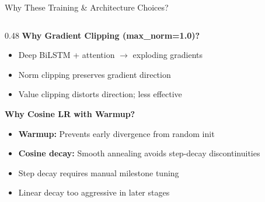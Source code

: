 \documentclass[10pt, aspectratio=169]{beamer}
\begin{document}
\begin{frame}{Why These Training \& Architecture Choices?}
\begin{columns}[T]
\begin{column}{0.48\textwidth}
      \vspace{0.1cm}
      \textbf{Why Gradient Clipping (max\_norm=1.0)?}
      \begin{itemize}\setlength{\itemsep}{0pt}
        \item Deep BiLSTM + attention $\rightarrow$ exploding gradients
        \item Norm clipping preserves gradient direction
        \item Value clipping distorts direction; less effective
      \end{itemize}

      \vspace{0.1cm}
      \textbf{Why Cosine LR with Warmup?}
      \begin{itemize}\setlength{\itemsep}{0pt}
        \item \textbf{Warmup:} Prevents early divergence from random init
        \item \textbf{Cosine decay:} Smooth annealing avoids step-decay discontinuities
        \item Step decay requires manual milestone tuning
        \item Linear decay too aggressive in later stages
      \end{itemize}
    \end{column}
  \end{columns}
\end{frame}
\end{document}
